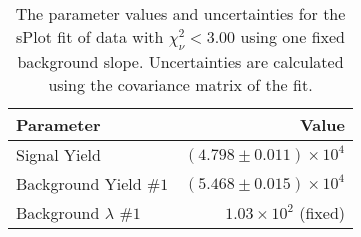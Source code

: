 
\begin{table}[ht]
    \begin{center}
        \begin{tabular}{lr}\toprule
            Parameter & Value \\\midrule
            Signal Yield & $(4.798 \pm 0.011) \times 10^{4}$ \\
            Background Yield $\#1$ & $(5.468 \pm 0.015) \times 10^{4}$ \\
            Background $\lambda$ $\#1$ & $1.03 \times 10^{2}$ (fixed) \\\bottomrule
        \end{tabular}
        \caption{The parameter values and uncertainties for the sPlot fit of data with $\chi^2_\nu < 3.00$ using one fixed background slope. Uncertainties are calculated using the covariance matrix of the fit.}\label{tab:splot-fit-results-chisqdof-3.00-fixed-1}
    \end{center}
\end{table}
